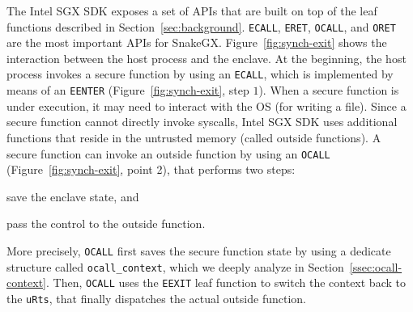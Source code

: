 The Intel SGX SDK exposes a set of APIs that are built on top of the leaf 
functions described in Section~\ref{sec:background}.
\texttt{ECALL}, \texttt{ERET}, \texttt{OCALL}, and \texttt{ORET} are the most 
important APIs for SnakeGX.
Figure~\ref{fig:synch-exit} shows the interaction between the host process and 
the enclave.
At the beginning, the host process invokes a secure function by using an 
\texttt{ECALL}, which is implemented by means of an \texttt{EENTER} 
(Figure~\ref{fig:synch-exit}, step $1$).
When a secure function is under execution, it may need to interact with the OS 
(\eg for writing a file).
Since a secure function cannot directly invoke syscalls, Intel SGX SDK uses 
additional functions that reside in the untrusted memory (\ie called
outside functions).
A secure function can invoke an outside function by using an \texttt{OCALL} 
(Figure~\ref{fig:synch-exit}, point 2), that performs two steps:
\begin{enumerate*}[label=(\roman*)]
	\item save the enclave state, and
	\item pass the control to the outside function.
\end{enumerate*}
More precisely, \texttt{OCALL} first saves the secure function state by using 
a dedicate structure called \texttt{ocall\_context}, which we deeply analyze 
in Section~\ref{ssec:ocall-context}.
Then, \texttt{OCALL} uses the \texttt{EEXIT} leaf function to switch 
the context back to the \texttt{uRts}, that finally dispatches the
actual outside function.
